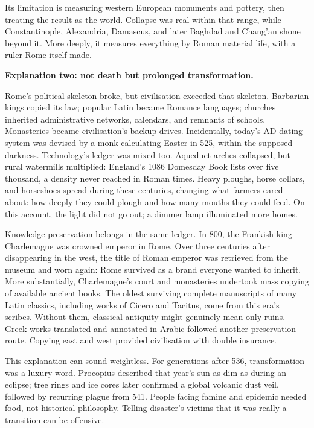 Its limitation is measuring western European monuments and pottery, then treating the result as the world. Collapse was real within that range, while Constantinople, Alexandria, Damascus, and later Baghdad and Chang'an shone beyond it. More deeply, it measures everything by Roman material life, with a ruler Rome itself made.

\textbf{Explanation two: not death but prolonged transformation.}

Rome's political skeleton broke, but civilisation exceeded that skeleton. Barbarian kings copied its law; popular Latin became Romance languages; churches inherited administrative networks, calendars, and remnants of schools. Monasteries became civilisation's backup drives. Incidentally, today's AD dating system was devised by a monk calculating Easter in 525, within the supposed darkness. Technology's ledger was mixed too. Aqueduct arches collapsed, but rural watermills multiplied: England's 1086 Domesday Book lists over five thousand, a density never reached in Roman times. Heavy ploughs, horse collars, and horseshoes spread during these centuries, changing what farmers cared about: how deeply they could plough and how many mouths they could feed. On this account, the light did not go out; a dimmer lamp illuminated more homes.

Knowledge preservation belongs in the same ledger. In 800, the Frankish king Charlemagne was crowned emperor in Rome. Over three centuries after disappearing in the west, the title of Roman emperor was retrieved from the museum and worn again: Rome survived as a brand everyone wanted to inherit. More substantially, Charlemagne's court and monasteries undertook mass copying of available ancient books. The oldest surviving complete manuscripts of many Latin classics, including works of Cicero and Tacitus, come from this era's scribes. Without them, classical antiquity might genuinely mean only ruins. Greek works translated and annotated in Arabic followed another preservation route. Copying east and west provided civilisation with double insurance.

This explanation can sound weightless. For generations after 536, transformation was a luxury word. Procopius described that year's sun as dim as during an eclipse; tree rings and ice cores later confirmed a global volcanic dust veil, followed by recurring plague from 541. People facing famine and epidemic needed food, not historical philosophy. Telling disaster's victims that it was really a transition can be offensive.

